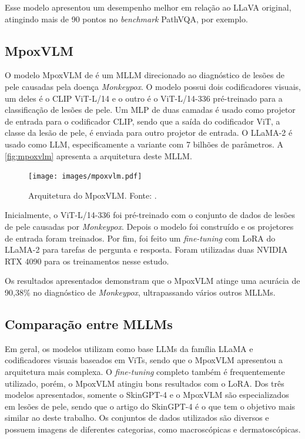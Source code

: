 Esse modelo apresentou um desempenho melhor em relação ao \ac{LLaVA} original, atingindo mais de 90 pontos no \textit{benchmark} PathVQA, por exemplo.

\subsection{MpoxVLM}

O modelo MpoxVLM de \textcite{cao2024mpoxvlm} é um \ac{MLLM} direcionado ao diagnóstico de lesões de pele causadas pela doença \textit{Monkeypox}. O modelo possui dois
codificadores visuais, um deles é o \ac{CLIP} \ac{ViT}-L/14 e o outro é o \ac{ViT}-L/14-336 pré-treinado para a classificação de lesões de pele. Um \ac{MLP} de duas camadas
é usado como projetor de entrada para o codificador \ac{CLIP}, sendo que a saída do codificador \ac{ViT}, a classe da lesão de pele, é enviada para outro projetor de
entrada. O \ac{LLaMA}-2 é usado como \ac{LLM}, especificamente a variante com 7 bilhões de parâmetros. A \autoref{fig:mpoxvlm} apresenta a arquitetura deste \ac{MLLM}.

\begin{figure}[ht]
    \centering
    \texttt{[image: images/mpoxvlm.pdf]}
    \caption{\small Arquitetura do MpoxVLM. Fonte: \textcite{cao2024mpoxvlm}.}
    \label{fig:mpoxvlm}
\end{figure}

Inicialmente, o \ac{ViT}-L/14-336 foi pré-treinado com o conjunto de dados de lesões de pele causadas por \textit{Monkeypox}. Depois o modelo foi construído e os
projetores de entrada foram treinados. Por fim, foi feito um \textit{fine-tuning} com \ac{LoRA} do \ac{LLaMA}-2 para tarefas de pergunta e resposta. Foram utilizadas
duas NVIDIA RTX 4090 para os treinamentos nesse estudo.

Os resultados apresentados demonstram que o MpoxVLM atinge uma acurácia de 90,38\% no diagnóstico de \textit{Monkeypox}, ultrapassando vários outros \acp{MLLM}.

\subsection{Comparação entre MLLMs} %

Em geral, os modelos utilizam como base \acp{LLM} da família \ac{LLaMA} e codificadores visuais baseados em \acp{ViT}, sendo que o MpoxVLM apresentou a arquitetura
mais complexa. O \textit{fine-tuning} completo também é frequentemente utilizado, porém, o MpoxVLM atingiu bons resultados com o \ac{LoRA}. Dos três modelos apresentados,
somente o Skin\ac{GPT}-4 e o MpoxVLM são especializados em lesões de pele, sendo que o artigo do Skin\ac{GPT}-4 é o que tem o objetivo mais similar ao deste trabalho. Os
conjuntos de dados utilizados são diversos e possuem imagens de diferentes categorias, como macroscópicas e dermatoscópicas.

